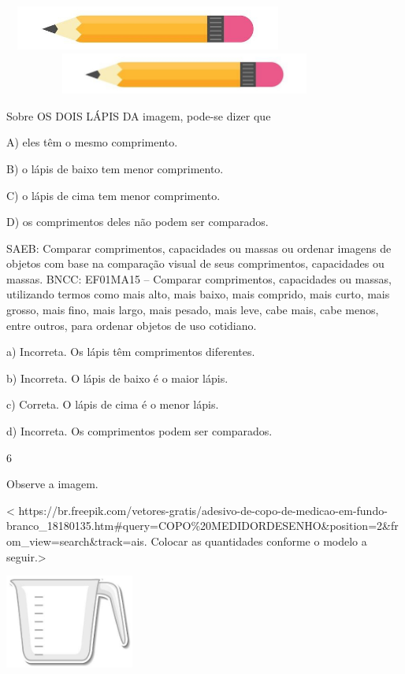 \includegraphics[width=3.74118in,height=0.57310in]{media/image29.jpg}\includegraphics[width=4.71287in,height=0.53673in]{media/image29.jpg}

Sobre OS DOIS LÁPIS DA imagem, pode-se dizer que

A) eles têm o mesmo comprimento.

B) o lápis de baixo tem menor comprimento.

C) o lápis de cima tem menor comprimento.

D) os comprimentos deles não podem ser comparados.

SAEB: Comparar comprimentos, capacidades ou massas ou ordenar
imagens de objetos com base na comparação visual de seus comprimentos,
capacidades ou massas.
BNCC: EF01MA15 -- Comparar comprimentos, capacidades ou massas,
utilizando termos como mais alto, mais baixo, mais comprido, mais curto,
mais grosso, mais fino, mais largo, mais pesado, mais leve, cabe mais,
cabe menos, entre outros, para ordenar objetos de uso cotidiano.

a) Incorreta. Os lápis têm comprimentos diferentes.

b) Incorreta. O lápis de baixo é o maior lápis.

c) Correta. O lápis de cima é o menor lápis.

d) Incorreta. Os comprimentos podem ser comparados.

\num{6}

Observe a imagem.

\textless{}
https://br.freepik.com/vetores-gratis/adesivo-de-copo-de-medicao-em-fundo-branco\_18180135.htm\#query=COPO\%20MEDIDORDESENHO\&position=2\&from\_view=search\&track=ais.
Colocar as quantidades conforme o modelo a seguir.\textgreater{}

\includegraphics[width=1.66282in,height=1.21657in]{media/image107.jpg}

